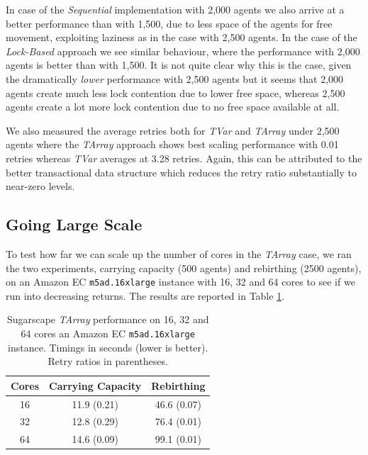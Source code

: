 In case of the \textit{Sequential} implementation with 2,000 agents we also arrive at a better performance than with 1,500, due to less space of the agents for free movement, exploiting laziness as in the case with 2,500 agents. In the case of the \textit{Lock-Based} approach we see similar behaviour, where the performance with 2,000 agents is better than with 1,500. It is not quite clear why this is the case, given the dramatically \textit{lower} performance with 2,500 agents but it seems that 2,000 agents create much less lock contention due to lower free space, whereas 2,500 agents create a lot more lock contention due to no free space available at all.

We also measured the average retries both for \textit{TVar} and \textit{TArray} under 2,500 agents where the \textit{TArray} approach shows best scaling performance with 0.01 retries whereas \textit{TVar} averages at 3.28 retries. Again, this can be attributed to the better transactional data structure which reduces the retry ratio substantially to near-zero levels.

\subsection{Going Large Scale}
To test how far we can scale up the number of cores in the \textit{TArray} case, we ran the two experiments, carrying capacity (500 agents) and rebirthing (2500 agents), on an Amazon EC \texttt{m5ad.16xlarge} instance with 16, 32 and 64 cores to see if we run into decreasing returns. The results are reported in Table \ref{tab:sug_varying_cores_amazon}.

\begin{table}
	\centering	
 
  	\begin{tabular}{ c || c | c }
        Cores  & Carrying Capacity  & Rebirthing    \\ \hline \hline 
    	    16     & 11.9 (0.21)        & 46.6 (0.07)   \\ \hline
   		32     & 12.8 (0.29)        & 76.4 (0.01)   \\ \hline
   		64     & 14.6 (0.09)        & 99.1 (0.01)   \\ \hline \hline
   	\end{tabular}

  	\caption{Sugarscape \textit{TArray} performance on 16, 32 and 64 cores an Amazon EC \texttt{m5ad.16xlarge} instance. Timings in seconds (lower is better). Retry ratios in parentheses.}
	\label{tab:sug_varying_cores_amazon}
\end{table}

